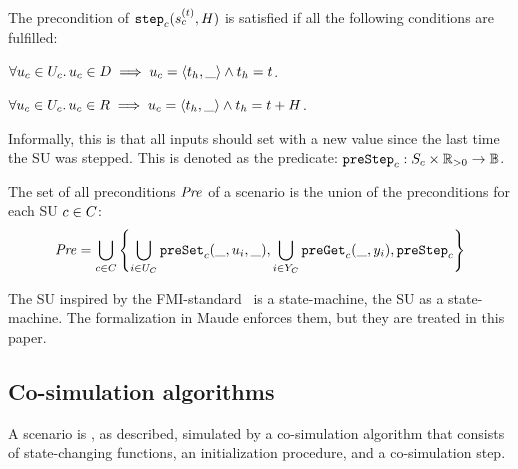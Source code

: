   \begin{definition}\label{def:step}
  The precondition of $\mathtt{step}_{c}(s_{c}^{(t)}, H)$ is satisfied if all the following conditions are fulfilled:
  \begin{compactitem}
    \item $\forall u_{c} \in U_{c} \ldotp u_{c} \in D \implies u_{c} =  \left\langle t_h,\_ \right\rangle  \land t_h = t$. 
    \item  $\forall u_{c} \in U_{c} \ldotp u_{c} \in R \implies u_{c} =  \left\langle t_h,\_ \right\rangle  \land t_h = t + H$.
  \end{compactitem}
  Informally, this is that all inputs should set with a new value since the last time the SU was stepped.
  This is denoted as the predicate: $\mathtt{preStep}_{c}: S_{c} \times \mathbb{R}_{> 0} \to \mathbb{B}$.
  \end{definition}
\begin{definition}\label{def:precondition}
  The set of all preconditions $\mathit{Pre}$ of a scenario is the union of the preconditions for each SU $c \in C$:
  \begin{align}
    \mathit{Pre} = \bigcup_{c \in C}  \left\{ \bigcup_{i \in U_{C}}\mathtt{preSet}_{c}(\_, u_{i}, \_), \bigcup_{i \in Y_{C}}\mathtt{preGet}_{c}(\_, y_{i}), \mathtt{preStep}_{c} \right\}
  \end{align}
\end{definition}

The SU inspired by the FMI-standard~\cite{FMI2014} is a state-machine, the  SU as a state-machine.
The formalization in Maude enforces them, but they are treated in this paper.

\subsection{Co-simulation algorithms}\label{sc:cosimalgo}
A scenario is , as described, simulated by a co-simulation algorithm that consists of state-changing functions, an initialization procedure, and a co-simulation step. 

